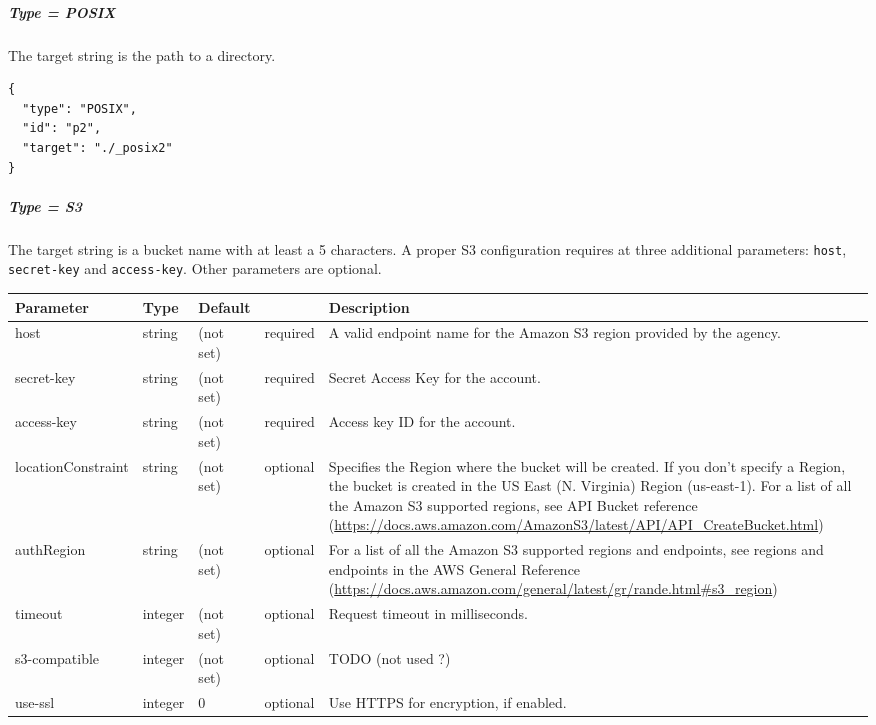 \subparagraph{Type = POSIX}
The target string is the path to a directory.
\begin{lstlisting}
{
  "type": "POSIX",
  "id": "p2",
  "target": "./_posix2"
}
\end{lstlisting}
\FloatBarrier
\vspace{\gapsize}

\subparagraph{Type = S3}
The target string is a bucket name with at least a 5 characters.
A proper S3 configuration requires at three additional parameters: \lstinline|host|, \lstinline|secret-key| and \lstinline|access-key|.
Other parameters are optional.

\begin{preserve}
  \begin{scriptsize}
    \noindent
    \begin{tabularx}{\textwidth}{llllX}
      Parameter              & Type    & Default    &          & Description \\
      \hline
      host                   & string  & (not set)  & required & A valid endpoint name for the Amazon S3 region provided by the agency. \\
      secret-key             & string  & (not set)  & required & Secret Access Key for the account. \\
      access-key             & string  & (not set)  & required & Access key ID for the account. \\
      locationConstraint     & string  & (not set)  & optional & Specifies the Region where the bucket will be created. If you don't specify a Region, the bucket is created in the US East (N. Virginia) Region (us-east-1). For a list of all the Amazon S3 supported regions, see API Bucket reference (\url{https://docs.aws.amazon.com/AmazonS3/latest/API/API_CreateBucket.html}) \\
      authRegion             & string  & (not set)  & optional & For a list of all the Amazon S3 supported regions and endpoints, see regions and endpoints in the AWS General Reference (\url{https://docs.aws.amazon.com/general/latest/gr/rande.html\#s3_region}) \\
      timeout                & integer & (not set)  & optional & Request timeout in milliseconds. \\
      s3-compatible          & integer & (not set)  & optional & TODO (not used ?) \\
      use-ssl                & integer & 0          & optional & Use HTTPS for encryption, if enabled. \\
    \end{tabularx}
  \end{scriptsize}
\end{preserve}

